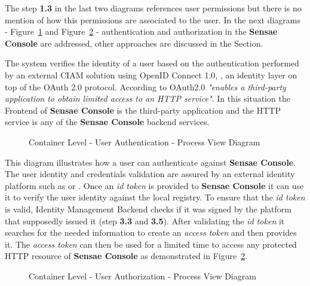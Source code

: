 The step \textbf{1.3} in the last two diagrams references user permissions but there is no mention of how this permissions are associated to the user. In the next diagrams - Figure~\ref{fig:design:architecture:container:process:diagram:authentication} and Figure~\ref{fig:design:architecture:container:process:diagram:authorization} - authentication and authorization in the \textbf{Sensae Console} are addressed, other approaches are discussed in the  Section.

The system verifies the identity of a user based on the authentication performed by an external \gls{CIAM} solution using OpenID Connect 1.0, \cite{openid}, an identity layer on top of the OAuth 2.0 protocol. According to \cite{oauth} OAuth2.0 \textit{"enables a third-party application to obtain limited access to an HTTP service"}. In this situation the Frontend of \textbf{Sensae Console} is the third-party application and the HTTP service is any of the \textbf{Sensae Console} backend services.

\begin{figure}[H]
   \centering
   \resizebox{\columnwidth}{!}
   {      
      
   }
   \caption[Container Level - User Authentication - Process View Diagram]{Container Level - User Authentication - Process View Diagram}
   \label{fig:design:architecture:container:process:diagram:authentication}
\end{figure}

This diagram illustrates how a user can authenticate against \textbf{Sensae Console}.
The user identity and credentials validation are assured by an external identity platform such as  or . Once an \textit{id token} is provided to \textbf{Sensae Console} it can use it to verify the user identity against the local registry. To ensure that the \textit{id token} is valid, Identity Management Backend checks if it was signed by the platform that supposedly issued it (step \textbf{3.3} and \textbf{3.5}). After validating the \textit{id token} it searches for the needed information to create an \textit{access token} and then provides it. The \textit{access token} can then be used for a limited time to access any protected HTTP resource of \textbf{Sensae Console} as demonstrated in Figure~\ref{fig:design:architecture:container:process:diagram:authorization}.

\begin{figure}[H]
   \centering
   \resizebox{\columnwidth}{!}
   {
      
   }
   \caption[Container Level - User Authorization - Process View Diagram]{Container Level - User Authorization - Process View Diagram}
   \label{fig:design:architecture:container:process:diagram:authorization}
\end{figure}

